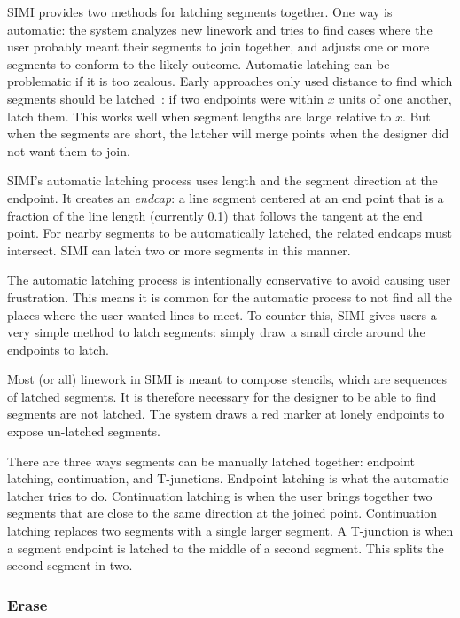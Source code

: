 \documentclass{article}
\begin{document}
SIMI provides two methods for latching segments together. One way is
automatic: the system analyzes new linework and tries to find cases
where the user probably meant their segments to join together, and
adjusts one or more segments to conform to the likely
outcome. Automatic latching can be problematic if it is too
zealous. Early approaches only used distance to find which segments
should be latched~\cite{herot-latch-corners}: if two endpoints were
within $x$ units of one another, latch them. This works well when
segment lengths are large relative to $x$. But when the segments are
short, the latcher will merge points when the designer did not want
them to join. 

SIMI's automatic latching process uses length and the segment
direction at the endpoint. It creates an \textit{endcap}: a line
segment centered at an end point that is a fraction of the line length
(currently 0.1) that follows the tangent at the end point. For nearby
segments to be automatically latched, the related endcaps must
intersect. SIMI can latch two or more segments in this manner.

The automatic latching process is intentionally conservative to avoid
causing user frustration. This means it is common for the automatic
process to not find all the places where the user wanted lines to
meet. To counter this, SIMI gives users a very simple method to latch
segments: simply draw a small circle around the endpoints to latch.

Most (or all) linework in SIMI is meant to compose stencils, which are
sequences of latched segments. It is therefore necessary for the
designer to be able to find segments are not latched. The system draws
a red marker at lonely endpoints to expose un-latched segments.

There are three ways segments can be manually latched together:
endpoint latching, continuation, and T-junctions. Endpoint latching is
what the automatic latcher tries to do. Continuation latching is when
the user brings together two segments that are close to the same
direction at the joined point. Continuation latching replaces two
segments with a single larger segment. A T-junction is when a segment
endpoint is latched to the middle of a second segment. This splits the
second segment in two.

\subsubsection{Erase}
\end{document}
